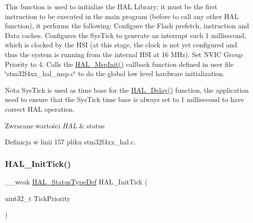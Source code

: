 This function is used to initialize the H\+AL Library; it must be the first instruction to be executed in the main program (before to call any other H\+AL function), it performs the following\+: Configure the Flash prefetch, instruction and Data caches. Configures the Sys\+Tick to generate an interrupt each 1 millisecond, which is clocked by the H\+SI (at this stage, the clock is not yet configured and thus the system is running from the internal H\+SI at 16 M\+Hz). Set N\+V\+IC Group Priority to 4. Calls the \hyperlink{stm32f4xx__hal__msp_8c_gae4fb8e66865c87d0ebab74a726a6891f}{H\+A\+L\+\_\+\+Msp\+Init()} callback function defined in user file \char`\"{}stm32f4xx\+\_\+hal\+\_\+msp.\+c\char`\"{} to do the global low level hardware initialization. 

\begin{DoxyNote}{Nota}
Sys\+Tick is used as time base for the \hyperlink{group___h_a_l___exported___functions___group2_gab1dc1e6b438daacfe38a312a90221330}{H\+A\+L\+\_\+\+Delay()} function, the application need to ensure that the Sys\+Tick time base is always set to 1 millisecond to have correct H\+AL operation. 
\end{DoxyNote}

\begin{DoxyRetVals}{Zwracane wartości}
{\em H\+AL} & status \\
\hline
\end{DoxyRetVals}


Definicja w linii 157 pliku stm32f4xx\+\_\+hal.\+c.

\mbox{\label{group___h_a_l___exported___functions___group1_ga44d1542f9985b2243b14a41070cc41cc}} 
\subsubsection{\texorpdfstring{H\+A\+L\+\_\+\+Init\+Tick()}{HAL\_InitTick()}}
{\footnotesize\ttfamily \+\_\+\+\_\+weak \hyperlink{stm32f4xx__hal__def_8h_a63c0679d1cb8b8c684fbb0632743478f}{H\+A\+L\+\_\+\+Status\+Type\+Def} H\+A\+L\+\_\+\+Init\+Tick (\begin{DoxyParamCaption}\item[{uint32\+\_\+t}]{Tick\+Priority }\end{DoxyParamCaption})}



